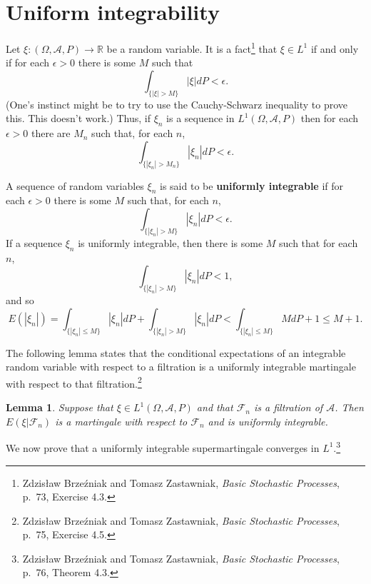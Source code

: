 \documentclass{article}
\newtheorem{lemma}[theorem]{Lemma}
\theoremstyle{definition}
\begin{document}
\section{Uniform integrability}
Let $\xi:(\Omega,\mathscr{A},P) \to \mathbb{R}$ be a random variable.
It is a fact\footnote{Zdzis\l{}aw Brze\'zniak and Tomasz Zastawniak, {\em Basic Stochastic Processes},
p.~73, Exercise 4.3.} that $\xi \in L^1$ if and only if for each $\epsilon>0$ there is some
$M$ such that
\[
\int_{\{|\xi|>M\}} |\xi| dP < \epsilon.
\]
(One's instinct might be to try to use the Cauchy-Schwarz inequality to prove this. This doesn't work.)
Thus, if $\xi_n$ is a sequence in $L^1(\Omega,\mathscr{A},P)$ then  for each $\epsilon>0$ there
are $M_n$ such that, for each $n$,
\[
\int_{\{|\xi_n|>M_n\}} |\xi_n| dP < \epsilon.
\]

A sequence of random variables $\xi_n$ is said to be \textbf{uniformly integrable}
if for each $\epsilon>0$ there is some $M$ such that, for each $n$,
\[
\int_{\{|\xi_n|>M\}} |\xi_n| dP < \epsilon.
\]
If a sequence $\xi_n$ is uniformly integrable, then there is some $M$ such that for each $n$,
\[
\int_{\{|\xi_n|>M\}} |\xi_n| dP < 1,
\]
and so
\[
E(|\xi_n|) = \int_{\{|\xi_n| \leq M\}} |\xi_n| dP + \int_{\{|\xi_n|>M\}} |\xi_n| dP
< \int_{\{|\xi_n| \leq M\}} M dP + 1
\leq M+1.
\]

The following lemma states that the conditional expectations of an integrable random variable
with respect to a filtration is a uniformly integrable martingale with respect to that filtration.\footnote{Zdzis\l{}aw Brze\'zniak and Tomasz Zastawniak, {\em Basic Stochastic Processes},
p.~75, Exercise 4.5.}

\begin{lemma}
Suppose that $\xi \in L^1(\Omega,\mathscr{A},P)$ and that $\mathscr{F}_n$ is a filtration of $\mathscr{A}$.
Then $E(\xi|\mathscr{F}_n)$ is a martingale with respect to $\mathscr{F}_n$ and is uniformly integrable.
\label{integrable}
\end{lemma}

We now prove that a uniformly integrable supermartingale converges in $L^1$.\footnote{Zdzis\l{}aw Brze\'zniak and Tomasz Zastawniak, {\em Basic Stochastic Processes},
p.~76, Theorem 4.3.}
\end{document}

